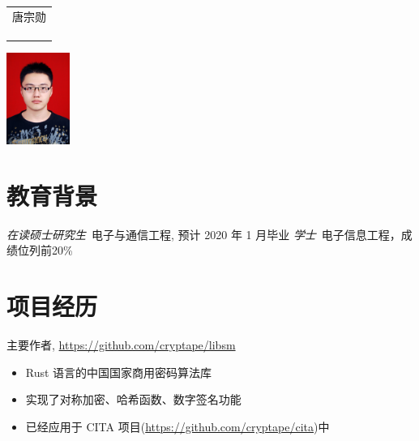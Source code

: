 \documentclass{resume}
\newcommand{\hlink}[1]{\href{#1}{#1}}
\begin{document}

\medskip\noindent
\begin{minipage}{0.7\textwidth}
  \Large{
    \begin{tabu}  { l }
      \scshape{唐宗勋} \\
       \\
       \\
       \\
    \end{tabu}
  }
\end{minipage}
\begin{minipage}{0.3\textwidth}
  \raggedleft
  \includegraphics[height=30mm]{me}
\end{minipage}

%


\section{教育背景}
\textit{在读硕士研究生}\ 电子与通信工程, 预计 2020 年 1 月毕业
\textit{学士}\ 电子信息工程，成绩位列前20\%

\section{项目经历}
主要作者, \hlink{https://github.com/cryptape/libsm}
\begin{itemize}
  \item Rust 语言的中国国家商用密码算法库
  \item 实现了对称加密、哈希函数、数字签名功能
  \item 已经应用于 CITA 项目(\hlink{https://github.com/cryptape/cita})中
\end{itemize}
\end{document}
